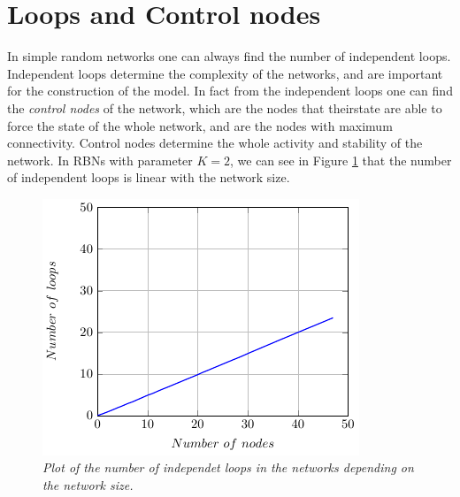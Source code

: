 \section{Loops and Control nodes}
In simple random networks one can always find the number of independent loops.
Independent loops determine the complexity of the networks\cite{K38}, and are important for the construction of the model. In fact from the independent loops one can find the \emph{control nodes} of the network, which are the nodes that theirstate are able to force the state of the whole network, and are the nodes with maximum connectivity. Control nodes determine the whole activity and stability of the network. 
In RBNs with parameter $K=2$, we can see in Figure \ref{fig:loops} that the number of independent loops is linear with the network size.
\begin{figure}[h]
\centering
\includegraphics[scale=1.5]{images/loops.pdf}
\caption{\emph{Plot of the number of independet loops in the networks depending on the network size.}}
\label{fig:loops}
\end{figure}



